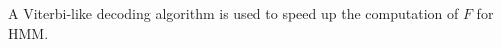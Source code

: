 A Viterbi-like decoding algorithm is used to speed up the computation of $F$ for HMM.








                  

              

